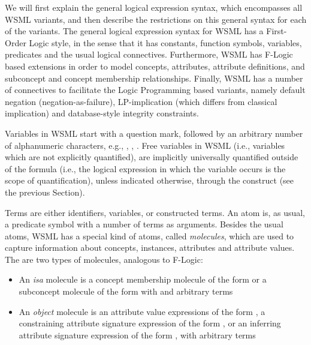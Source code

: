 We will first explain the general logical expression syntax, which
encompasses all WSML variants, and then describe the restrictions on
this general syntax for each of the variants. The general logical
expression syntax for WSML has a First-Order Logic style, in the
sense that it has constants, function symbols, variables, predicates
and the usual logical connectives. Furthermore, WSML has F-Logic
\cite{Kifer+LausenETAL-LogiFounObjeFram:95} based extensions in
order to model concepts, attributes, attribute definitions, and
subconcept and concept membership relationships. Finally, WSML has a
number of connectives to facilitate the Logic Programming based
variants, namely default negation (negation-as-failure),
LP-implication (which differs from classical implication) and
database-style integrity constraints.

Variables in WSML start with a question mark, followed by an
arbitrary number of alphanumeric characters, e.g., ,
, . Free variables in WSML (i.e., variables
which are not explicitly quantified), are implicitly universally
quantified outside of the formula (i.e., the logical expression in
which the variable occurs is the scope of quantification), unless
indicated otherwise, through the  construct
(see the previous Section).

Terms are either identifiers, variables, or constructed terms. An
atom is, as usual, a predicate symbol with a number of terms as
arguments. Besides the usual atoms, WSML has a special kind of
atoms, called \emph{molecules}, which are used to capture
information about concepts, instances, attributes and attribute
values. The are two types of molecules, analogous to F-Logic:

\begin{itemize}
\item An \emph{isa} molecule is a concept membership molecule of
  the form  or a subconcept
  molecule of the form 
  with  and  arbitrary terms

\item An \emph{object} molecule is an attribute value expressions
  of the form , a
  constraining attribute signature expression of the form
  , or an inferring attribute signature expression of the form
  , with
   arbitrary terms
\end{itemize}


